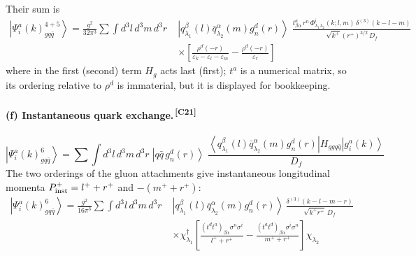 \documentclass[11pt]{article}
\newcommand{\ibarh}[2]{\draw[line width=1.1pt] (#1,#2-0.13) -- (#1,#2+0.13);}
\newcommand{\eps}{\varepsilon}
\newcommand{\dg}{\dagger}
\newcommand{\dthree}{\delta^{(3)}}
\newcommand{\ket}[1]{\left|#1\right\rangle}
\newcommand{\bra}[1]{\left\langle#1\right|}
\newcommand{\Ph}{\Phi}
\newcommand{\qk}[3]{q^{#1}_{#2}(#3)}
\newcommand{\aqk}[3]{\bar q^{#1}_{#2}(#3)}
\newcommand{\gl}[3]{g^{#1}_{#2}(#3)}
\newcommand{\chg}[1]{{\color{blue!70!black}\textsuperscript{\,[C#1]}}}
\begin{document}
Their sum is
\begin{align}
\ket{\Psi^{a}_{i}(k)^{4+5}_{gq\bar q}}=\frac{g^{2}}{32\pi^{3}}\sum\int\!d^{3}l\,d^{3}m\,d^{3}r\;
&\ket{\qk{\beta}{\lambda_{1}}{l}\aqk{\alpha}{\lambda_{2}}{m}\gl{d}{n}{r}}\;
\frac{t^{a}_{\beta\alpha}\,r^{n}\,\Ph^{i}_{\lambda_{1}\lambda_{2}}(k;l,m)\,\dthree(k-l-m)}
{\sqrt{k^{+}}(r^{+})^{3/2}\,D_{f}}
\nonumber\\&\times
\left[\frac{\rho^{d}(-r)}{\eps_{k}-\eps_{l}-\eps_{m}}-\frac{\rho^{d}(-r)}{\eps_{r}}\right]
\label{eq:B2de}
\end{align}
where in the first (second) term $H_{g}$ acts last (first); $t^{a}$ is a numerical matrix, so its
ordering relative to $\rho^{d}$ is immaterial, but it is displayed for bookkeeping.

\paragraph{(f) Instantaneous quark exchange.\chg{21}}
\begin{center}
\end{center}
\begin{equation}
\ket{\Psi^{a}_{i}(k)^{6}_{gq\bar q}}=\sum\int\!d^{3}l\,d^{3}m\,d^{3}r\;
\ket{q\bar q\,\gl{d}{n}{r}}\;
\frac{\bra{\qk{\beta}{\lambda_{1}}{l}\aqk{\alpha}{\lambda_{2}}{m}\gl{d}{n}{r}}
H_{ggq\bar q}\ket{\gl{a}{i}{k}}}{D_{f}}
\end{equation}
The two orderings of the gluon attachments give instantaneous longitudinal momenta
$P^{+}_{\rm inst}=l^{+}+r^{+}$ and $-(m^{+}+r^{+})$:
\begin{align}
\ket{\Psi^{a}_{i}(k)^{6}_{gq\bar q}}=\frac{g^{2}}{16\pi^{3}}\sum\int\!d^{3}l\,d^{3}m\,d^{3}r\;
&\ket{\qk{\beta}{\lambda_{1}}{l}\aqk{\alpha}{\lambda_{2}}{m}\gl{d}{n}{r}}\,
\frac{\dthree(k-l-m-r)}{\sqrt{k^{+}r^{+}}\,D_{f}}
\nonumber\\&\times
\chi^{\dg}_{\lambda_{1}}\!\left[\frac{(t^{d}t^{a})_{\beta\alpha}\sigma^{n}\sigma^{i}}{l^{+}+r^{+}}
-\frac{(t^{a}t^{d})_{\beta\alpha}\sigma^{i}\sigma^{n}}{m^{+}+r^{+}}\right]\chi_{\lambda_{2}}
\label{eq:B2f}
\end{align}
\end{document}
